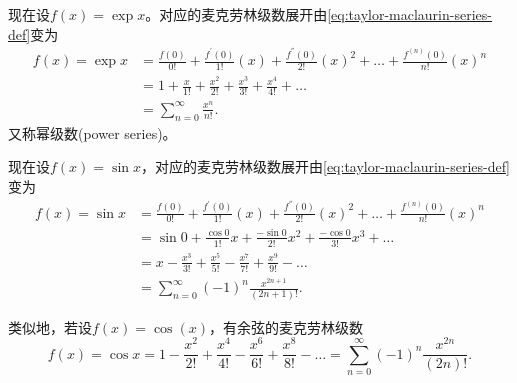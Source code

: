 \begin{subappendices}
\begin{lemma}
  \label{lemma:exponential-maclaurin}
  现在设$f(x)= \exp x$。对应的麦克劳林级数展开由\eqref{eq:taylor-maclaurin-series-def}变为
\begin{equation}
  \label{eq:exponential-maclaurin-series-def}
  \begin{split}
    f \left( x \right) = \exp x & = \frac{f(0)}{0!}
    + \frac{f^{'}(0)}{1!} \left( x  \right)
    + \frac{f^{''}(0)}{2!} \left( x \right)^{2}
    + \ldots
    + \frac{f^{(n)}(0)}{n!} \left( x \right)^{n} \\
    & = 1 + \frac{x}{1!} + \frac{x^{2}}{2!} + \frac{x^{3}}{3!} + \frac{x^{4}}{4!} + \ldots \\
    & = \sum_{n=0}^{\infty} \frac{x^{n}}{n!}.
  \end{split}
\end{equation}
又称幂级数(power series)。
\end{lemma}

\begin{lemma}[正弦的麦克劳林级数]
  \label{lemma:sin-maclaurin-series}
  现在设$f(x) = \sin x$，对应的麦克劳林级数展开由\eqref{eq:taylor-maclaurin-series-def}变为
  \begin{equation}
    \label{eq:sin-cos-maclaurin-series}
    \begin{split}
      f \left( x \right) = \sin x & = \frac{f(0)}{0!}
      + \frac{f^{'}(0)}{1!} \left( x  \right)
      + \frac{f^{''}(0)}{2!} \left( x \right)^{2}
      + \ldots
      + \frac{f^{(n)}(0)}{n!} \left( x \right)^{n} \\
      & = \sin 0 + \frac{\cos 0}{1!} x
      + \frac{- \sin 0}{2!} x^{2}
      + \frac{- \cos 0}{3!} x^{3} + \ldots \\
      & = x - \frac{x^{3}}{3!} + \frac{x^{5}}{5!} - \frac{x^{7}}{7!} + \frac{x^{9}}{9!} - \ldots \\
      & = \sum_{n=0}^{\infty} \left( -1 \right)^{n} \frac{x^{2n+1}}{ \left( 2n + 1 \right)!}.
    \end{split}
  \end{equation}
\end{lemma}

\begin{lemma}[余弦的麦克劳林级数]
  \label{lemma:cos-maclaurin-series}
  类似地，若设$f(x)=\cos(x)$，有余弦的麦克劳林级数
  \begin{equation}
    \label{eq:cos-maclaurin-series}
  f(x) =   \cos x = 1 - \frac{x^{2}}{2!} + \frac{x^{4}}{4!} - \frac{x^{6}}{6!} + \frac{x^{8}}{8!} - \ldots = \sum_{n=0}^{\infty} \left( -1 \right)^{n} \frac{x^{2n}}{\left( 2n \right)!}.
  \end{equation}
\end{lemma}


\end{subappendices}
